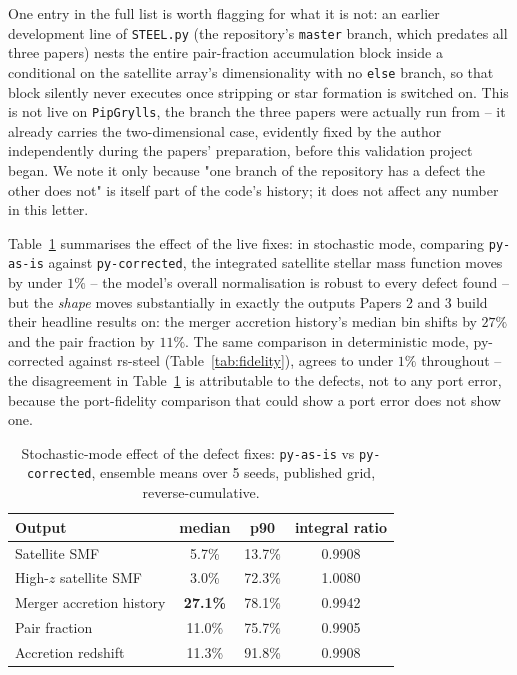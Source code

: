 \documentclass[fleqn,usenatbib]{mnras}
\begin{document}
One entry in the full list is worth flagging for what it is not: an
earlier development line of \texttt{STEEL.py} (the repository's
\texttt{master} branch, which predates all three papers) nests the
entire pair-fraction accumulation block inside a conditional on the
satellite array's dimensionality with no \texttt{else} branch, so that
block silently never executes once stripping or star formation is
switched on. This is not live on \texttt{PipGrylls}, the branch the
three papers were actually run from -- it already carries the
two-dimensional case, evidently fixed by the author independently
during the papers' preparation, before this validation project began.
We note it only because "one branch of the repository has a defect the
other does not" is itself part of the code's history; it does not
affect any number in this letter.

Table~\ref{tab:defects} summarises the effect of the live fixes: in
stochastic mode, comparing \texttt{py-as-is} against
\texttt{py-corrected}, the integrated satellite stellar mass function
moves by under $1\%$ -- the model's overall normalisation is robust to
every defect found -- but the \emph{shape} moves substantially in exactly
the outputs Papers 2 and 3 build their headline results on: the merger
accretion history's median bin shifts by $27\%$ and the pair fraction by
$11\%$. The same comparison in deterministic mode, py-corrected against
rs-steel (Table~\ref{tab:fidelity}), agrees to under $1\%$ throughout --
the disagreement in Table~\ref{tab:defects} is attributable to the
defects, not to any port error, because the port-fidelity comparison
that could show a port error does not show one.

\begin{table}
\centering
\caption{Stochastic-mode effect of the defect fixes: \texttt{py-as-is}
vs \texttt{py-corrected}, ensemble means over 5 seeds, published grid,
reverse-cumulative.}
\label{tab:defects}
\begin{tabular}{lccc}
\hline
Output & median & p90 & integral ratio \\
\hline
Satellite SMF & 5.7\% & 13.7\% & 0.9908 \\
High-$z$ satellite SMF & 3.0\% & 72.3\% & 1.0080 \\
Merger accretion history & \textbf{27.1\%} & 78.1\% & 0.9942 \\
Pair fraction & 11.0\% & 75.7\% & 0.9905 \\
Accretion redshift & 11.3\% & 91.8\% & 0.9908 \\
\hline
\end{tabular}
\end{table}
\end{document}
